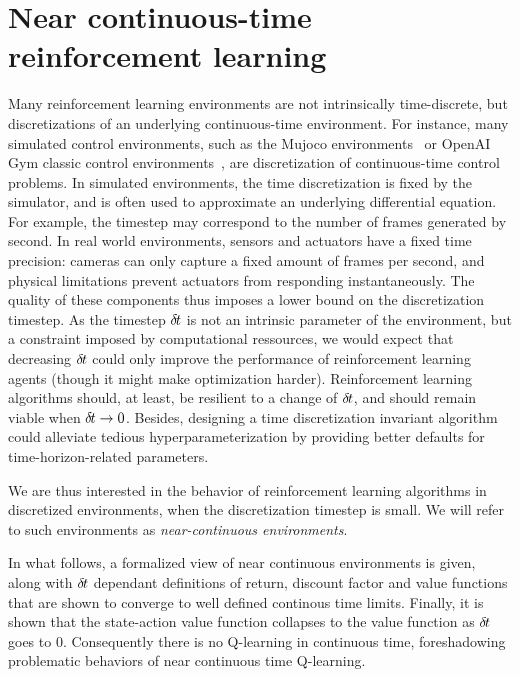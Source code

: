 \section{Near continuous-time reinforcement learning}
\label{sec:framework}

Many reinforcement learning environments are not intrinsically
time-discrete, but discretizations of an underlying continuous-time
environment. For instance, many simulated control environments, such as
the Mujoco environments~\cite{ddpg} or OpenAI Gym classic control
environments~\cite{gym}, are discretization of continuous-time control
problems.  In simulated environments, the time discretization is fixed by
the simulator, and is often used to approximate an underlying
differential equation.  For example, the timestep may correspond to the
number of frames generated by second.  In real world environments,
sensors and actuators have a fixed time precision: cameras can only
capture a fixed amount of frames per second, and physical limitations
prevent actuators from responding instantaneously. The quality of these
components thus imposes a lower bound on the discretization timestep. As
the timestep ${\delta\hspace{-.1em}t}$ is not an intrinsic parameter of the
environment, but a constraint imposed by computational ressources, we
would expect that decreasing ${\delta\hspace{-.1em}t}$ could only improve the performance
of reinforcement learning agents (though it might make optimization
harder).  Reinforcement
learning algorithms should, at least, be resilient to a change of
${\delta\hspace{-.1em}t}$, and should remain viable when ${\delta\hspace{-.1em}t} \rightarrow 0$.
Besides, designing a time discretization invariant algorithm could
alleviate tedious hyperparameterization by providing better defaults for
time-horizon-related parameters.

We are thus interested in the behavior of reinforcement learning
algorithms in discretized environments, when the discretization timestep
is small. We will refer to such environments as \emph{near-continuous
environments}.

In what follows, a formalized view of near continuous environments is
given, along with ${\delta\hspace{-.1em}t}$ dependant definitions of return, discount
factor and value functions that are shown to converge to well defined
continous time limits. Finally, it is shown that the state-action value
function collapses to the value function as ${\delta\hspace{-.1em}t}$ goes to $0$.
Consequently there is no Q-learning in continuous time, foreshadowing
problematic behaviors of near continuous time Q-learning.

